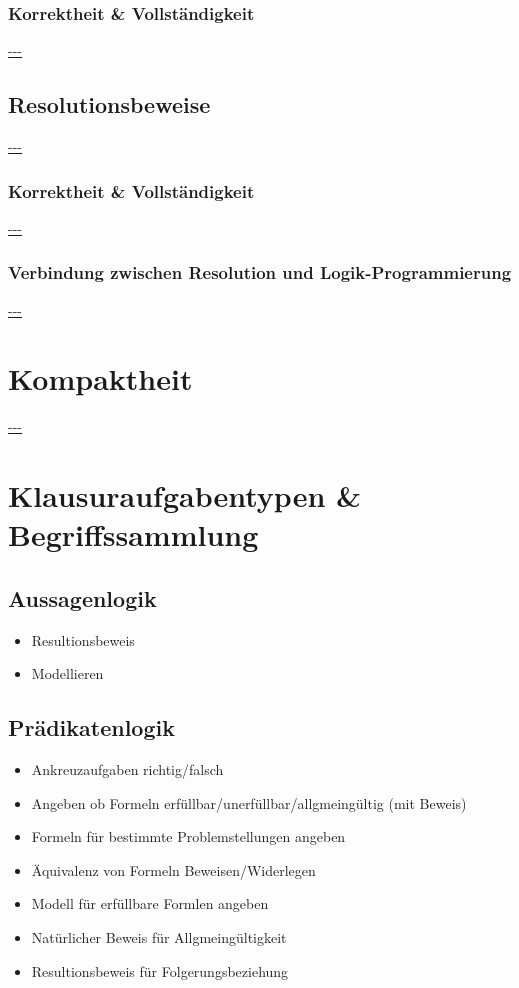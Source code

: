 \documentclass{article}
\begin{document}
    \subsubsection{Korrektheit \& Vollständigkeit}
    \url{---}\\

    \subsection{Resolutionsbeweise}
    \url{---}\\

    \subsubsection{Korrektheit \& Vollständigkeit}
    \url{---}\\

    \subsubsection{Verbindung zwischen Resolution und Logik-Programmierung}
    \url{---}\\

    \section{Kompaktheit}
    \url{---}\\

    \section{Klausuraufgabentypen \& Begriffssammlung}

    \subsection{Aussagenlogik}
    \begin{itemize}
        \item Resultionsbeweis
        \item Modellieren
    \end{itemize}

    \subsection{Prädikatenlogik}
    \begin{itemize}
        \item Ankreuzaufgaben richtig/falsch
        \item Angeben ob Formeln erfüllbar/unerfüllbar/allgmeingültig (mit Beweis)
        \item Formeln für bestimmte Problemstellungen angeben
        \item Äquivalenz von Formeln Beweisen/Widerlegen
        \item Modell für erfüllbare Formlen angeben
        \item Natürlicher Beweis für Allgmeingültigkeit
        \item Resultionsbeweis für Folgerungsbeziehung
    \end{itemize}
\end{document}

